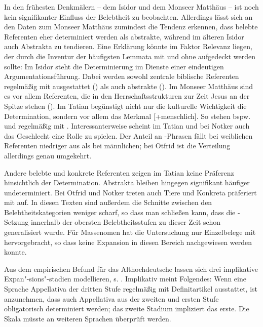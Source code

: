 In den frühesten Denkmälern -- dem Isidor und dem Monseer Matthäus -- ist noch kein signifikanter Einfluss der Belebtheit zu beobachten. Allerdings lässt sich an den Daten zum Monseer Matthäus zumindest die Tendenz erkennen, dass belebte Referenten eher determiniert werden als abstrakte, während im älteren Isidor auch Abstrakta zu  tendieren. Eine Erklärung könnte im Faktor Relevanz liegen, der durch die Inventur der häufigsten Lemmata mit und ohne  aufgedeckt werden sollte:  Im Isidor steht die Determinierung im Dienste einer eindeutigen Argumentationsführung. Dabei werden sowohl zentrale biblische Referenten regelmäßig mit  ausgestattet () als auch abstrakte (). Im Monseer Matthäus sind es vor allem Referenten, die in den Herrschaftsstrukturen zur Zeit Jesus an der Spitze stehen (). Im Tatian begünstigt nicht nur die kulturelle Wichtigkeit die Determination, sondern vor allem das Merkmal [+menschlich]. So stehen bspw.  und  regelmäßig mit . Interessanterweise scheint im Tatian und bei Notker auch das Geschlecht eine Rolle zu spielen. Der Anteil an -Phrasen fällt bei weiblichen Referenten niedriger aus als bei männlichen; bei Otfrid ist die Verteilung allerdings genau umgekehrt.

Andere belebte und konkrete Referenten zeigen im Tatian keine Präferenz hinsichtlich der Determination. Abstrakta bleiben hingegen signifikant häufiger undeterminiert. Bei Otfrid und Notker treten auch Tiere und Konkreta präferiert mit  auf. In diesen Texten sind außerdem die Schnitte zwischen den Belebtheitskategorien weniger scharf, so dass man schließen kann, dass die -Setzung innerhalb der obersten Belebtheitsstufen zu dieser Zeit schon generalisiert wurde. Für Massenomen hat die Untersuchung nur Einzelbelege mit  hervorgebracht, so dass keine Expansion in diesen Bereich nachgewiesen werden konnte.  

Aus dem empirischen Befund für das Althochdeutsche lassen sich drei implikative Expan"-sions"-stadien modellieren, s. . Implikativ meint Folgendes:  
Wenn eine Sprache Appellativa der dritten Stufe regelmäßig mit Definitartikel ausstattet, ist anzunehmen, dass auch Appellativa aus der zweiten und ersten Stufe obligatorisch determiniert werden; das zweite Stadium impliziert das erste. Die Skala müsste an weiteren Sprachen überprüft werden.  

